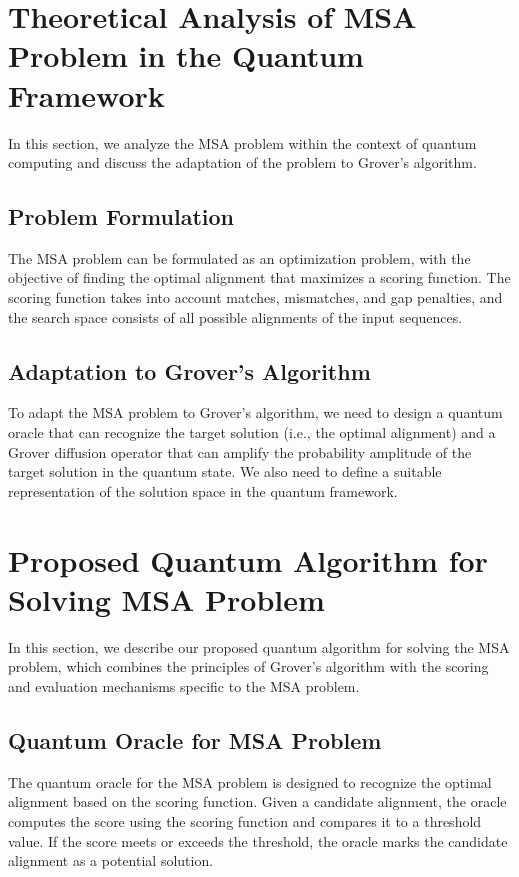 \section{Theoretical Analysis of MSA Problem in the Quantum Framework}

In this section, we analyze the MSA problem within the context of quantum computing and discuss the adaptation of the problem to Grover's algorithm.

\subsection{Problem Formulation}

The MSA problem can be formulated as an optimization problem, with the objective of finding the optimal alignment that maximizes a scoring function. The scoring function takes into account matches, mismatches, and gap penalties, and the search space consists of all possible alignments of the input sequences.

\subsection{Adaptation to Grover's Algorithm}

To adapt the MSA problem to Grover's algorithm, we need to design a quantum oracle that can recognize the target solution (i.e., the optimal alignment) and a Grover diffusion operator that can amplify the probability amplitude of the target solution in the quantum state. We also need to define a suitable representation of the solution space in the quantum framework.

\section{Proposed Quantum Algorithm for Solving MSA Problem}

In this section, we describe our proposed quantum algorithm for solving the MSA problem, which combines the principles of Grover's algorithm with the scoring and evaluation mechanisms specific to the MSA problem.

\subsection{Quantum Oracle for MSA Problem}

The quantum oracle for the MSA problem is designed to recognize the optimal alignment based on the scoring function. Given a candidate alignment, the oracle computes the score using the scoring function and compares it to a threshold value. If the score meets or exceeds the threshold, the oracle marks the candidate alignment as a potential solution.

